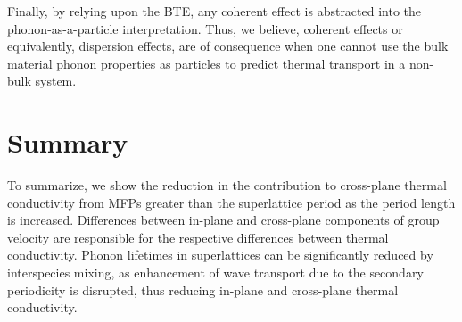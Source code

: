 \documentclass[aps,prb,preprint,preprintnumbers,amsmath,amssymb,floatfix,superscriptaddress]{revtex4}
\begin{document}
Finally, by relying upon the BTE, any coherent effect is abstracted into the phonon-as-a-particle interpretation. Thus, we believe, coherent effects or equivalently, dispersion effects, are of consequence when one cannot use the bulk material phonon properties as particles to predict thermal transport in a non-bulk system.

\section{Summary}

To summarize, we show the reduction in the contribution to cross-plane thermal conductivity from MFPs greater than the superlattice period as the period length is increased. Differences between in-plane and cross-plane components of group velocity are responsible for the respective differences between thermal conductivity. Phonon lifetimes in superlattices can be significantly reduced by interspecies mixing, as enhancement of wave transport due to the secondary periodicity is disrupted, thus reducing in-plane and cross-plane thermal conductivity.

\newpage
%

\end{document}
